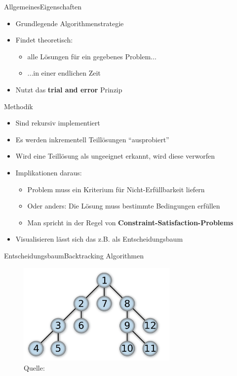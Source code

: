 \begin{frame}{Allgemeines}{Eigenschaften}
    \begin{itemize}
        \item Grundlegende Algorithmenstrategie
        \item Findet theoretisch:
        \begin{itemize}
        \item alle Lösungen für ein gegebenes Problem...
        \item ...in einer endlichen Zeit
        \end{itemize}
        \item Nutzt das \textbf{trial and error} Prinzip
    \end{itemize}
\end{frame}

\begin{frame}{Methodik}
    \begin{itemize}
        \item Sind rekursiv implementiert
        \item Es werden inkrementell Teillösungen "`ausprobiert"'
        \item Wird eine Teillösung als ungeeignet erkannt, wird diese verworfen
        \item Implikationen daraus:
        \begin{itemize}
            \item Problem muss ein Kriterium für Nicht-Erfüllbarkeit liefern
            \item Oder anders: Die Lösung muss bestimmte Bedingungen erfüllen
            \item Man spricht in der Regel von \textbf{Constraint-Satisfaction-Problems}
        \end{itemize}
        \item Visualisieren lässt sich das z.B. als Entscheidungsbaum
    \end{itemize}
\end{frame}

\begin{frame}{Entscheidungsbaum}{Backtracking Algorithmen}
    \begin{figure}
    \includegraphics[height=5cm]{graph/backtracking_tree}
    \caption*{Quelle: \cite{wiki:backtr}}
    \end{figure}
\end{frame}


